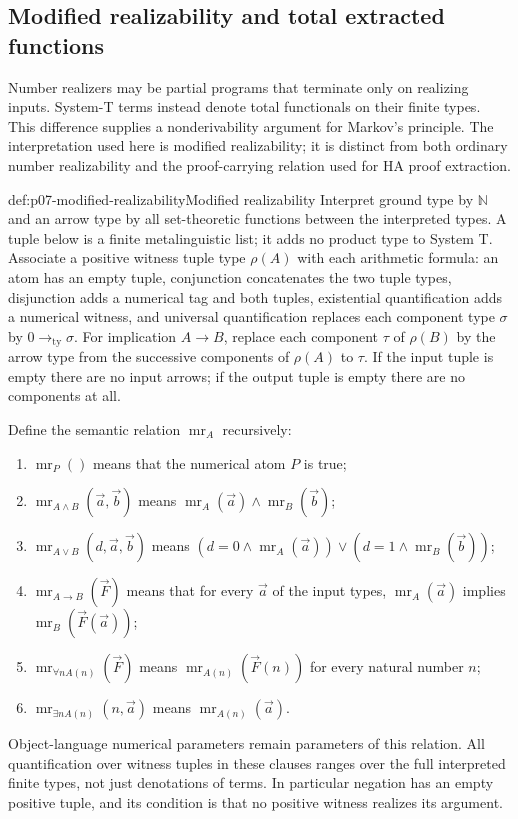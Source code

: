 \subsection{Modified realizability and total extracted functions}
\label{sec:p07-modified-realizability}

Number realizers may be partial programs that terminate only on
realizing inputs. System-T terms instead denote total functionals on
their finite types. This difference supplies a nonderivability argument
for Markov's principle. The interpretation used here is modified
realizability; it is distinct from both ordinary number realizability
and the proof-carrying relation used for HA proof extraction.

\begin{hbdefinition}{def:p07-modified-realizability}{Modified realizability}
Interpret ground type by \(\mathbb N\) and an arrow type by all
set-theoretic functions between the interpreted types. A tuple below
is a finite metalinguistic list; it adds no product type to System T.
Associate a positive witness tuple type \(\rho(A)\) with each
arithmetic formula: an atom has an empty tuple, conjunction concatenates
the two tuple types, disjunction adds a numerical tag and both tuples,
existential quantification adds a numerical witness, and universal
quantification replaces each component type \(\sigma\) by
\(0\to_{\mathrm{ty}}\sigma\). For implication \(A\to B\),
replace each component \(\tau\) of \(\rho(B)\) by the arrow type
from the successive components of \(\rho(A)\) to \(\tau\).
If the input tuple is empty there are no input arrows; if the output
tuple is empty there are no components at all.

Define the semantic relation \(\operatorname{mr}_A\) recursively:
\begin{enumerate}
\item \(\operatorname{mr}_P()\) means that the numerical atom \(P\)
      is true;
\item \(\operatorname{mr}_{A\land B}(\vec a,\vec b)\) means
      \(\operatorname{mr}_A(\vec a)\land\operatorname{mr}_B(\vec b)\);
\item \(\operatorname{mr}_{A\lor B}(d,\vec a,\vec b)\) means
      \((d=0\land\operatorname{mr}_A(\vec a))\lor
      (d=1\land\operatorname{mr}_B(\vec b))\);
\item \(\operatorname{mr}_{A\to B}(\vec F)\) means that for every
      \(\vec a\) of the input types,
      \(\operatorname{mr}_A(\vec a)\) implies
      \(\operatorname{mr}_B(\vec F(\vec a))\);
\item \(\operatorname{mr}_{\forall nA(n)}(\vec F)\) means
      \(\operatorname{mr}_{A(n)}(\vec F(n))\) for every natural
      number \(n\);
\item \(\operatorname{mr}_{\exists nA(n)}(n,\vec a)\) means
      \(\operatorname{mr}_{A(n)}(\vec a)\).
\end{enumerate}
Object-language numerical parameters remain parameters of this relation.
All quantification over witness tuples in these clauses ranges over
the full interpreted finite types, not just denotations of terms.
In particular negation has an empty positive tuple, and its condition
is that no positive witness realizes its argument.
\end{hbdefinition}
